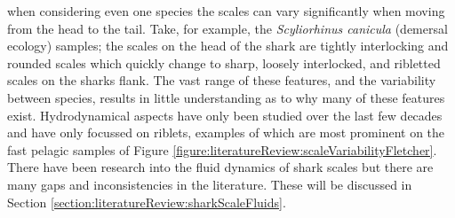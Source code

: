\documentclass[12pt,oneside,a4paper]{article}
\begin{document}
when considering even one species the scales can vary significantly when moving from the head to the tail. Take, for example, the \textit{Scyliorhinus canicula} (demersal ecology) samples; the scales on the head of the shark are tightly interlocking and rounded scales which quickly change to sharp, loosely interlocked, and ribletted scales on the sharks flank. The vast range of these features, and the variability between species, results in little understanding as to why many of these features exist. Hydrodynamical aspects have only been studied over the last few decades \citep{dean2010} and have only focussed on riblets, examples of which are most prominent on the fast pelagic samples of Figure \ref{figure:literatureReview:scaleVariabilityFletcher}. There have been research into the fluid dynamics of shark scales but there are many gaps and inconsistencies in the literature. These will be discussed in Section \ref{section:literatureReview:sharkScaleFluids}. 
%
\end{document}
